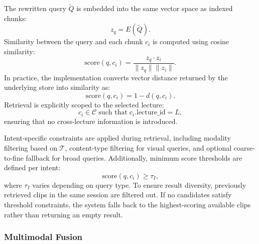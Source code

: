\documentclass[conference]{IEEEtran}
\begin{document}
    The rewritten query $\tilde{Q}$ is embedded into the same vector space as indexed chunks:
    \begin{equation}
    z_q = E(\tilde{Q}).
    \end{equation}
    Similarity between the query and each chunk $c_i$ is computed using cosine similarity:
    \begin{equation}
    \text{score}(q, c_i) = \frac{z_q \cdot z_i}{\|z_q\| \|z_i\|}.
    \end{equation}
    In practice, the implementation converts vector distance returned by the underlying store into similarity as:
    \begin{equation}
    \text{score}(q, c_i) = 1 - d(q, c_i).
    \end{equation}
    Retrieval is explicitly scoped to the selected lecture:
    \begin{equation}
    c_i \in \mathcal{C} \;\text{such that}\; c_i.\text{lecture\_id} = L,
    \end{equation}
    ensuring that no cross-lecture information is introduced.

    Intent-specific constraints are applied during retrieval, including modality filtering based on $\mathcal{T}$, content-type filtering for visual queries, and optional coarse-to-fine fallback for broad queries. Additionally, minimum score thresholds are defined per intent:
    \begin{equation}
    \text{score}(q, c_i) \geq \tau_I,
    \end{equation}
    where $\tau_I$ varies depending on query type. To ensure result diversity, previously retrieved clips in the same session are filtered out. If no candidates satisfy threshold constraints, the system falls back to the highest-scoring available clips rather than returning an empty result.

    \subsubsection{Multimodal Fusion}
\end{document}

